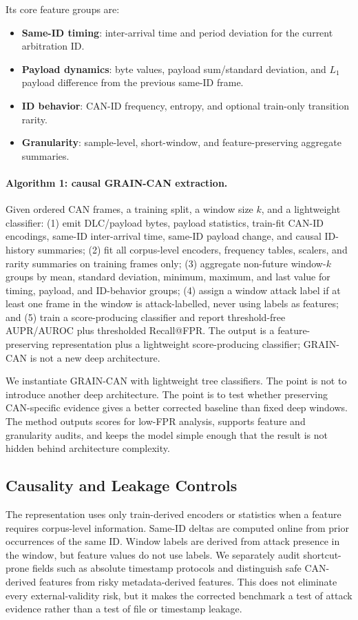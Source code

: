 \documentclass[runningheads]{llncs}%
\newcommand{\method}{GRAIN-CAN}
\begin{document}
Its core feature groups are:
\begin{itemize}
    \item \textbf{Same-ID timing}: inter-arrival time and period deviation for the current arbitration ID.
    \item \textbf{Payload dynamics}: byte values, payload sum/standard deviation, and $L_1$ payload difference from the previous same-ID frame.
    \item \textbf{ID behavior}: CAN-ID frequency, entropy, and optional train-only transition rarity.
    \item \textbf{Granularity}: sample-level, short-window, and feature-preserving aggregate summaries.
\end{itemize}


\paragraph{Algorithm 1: causal GRAIN-CAN extraction.}
Given ordered CAN frames, a training split, a window size $k$, and a lightweight classifier:
(1) emit DLC/payload bytes, payload statistics, train-fit CAN-ID encodings, same-ID inter-arrival time, same-ID payload change, and causal ID-history summaries;
(2) fit all corpus-level encoders, frequency tables, scalers, and rarity summaries on training frames only;
(3) aggregate non-future window-$k$ groups by mean, standard deviation, minimum, maximum, and last value for timing, payload, and ID-behavior groups;
(4) assign a window attack label if at least one frame in the window is attack-labelled, never using labels as features; and
(5) train a score-producing classifier and report threshold-free AUPR/AUROC plus thresholded Recall@FPR.
The output is a feature-preserving representation plus a lightweight score-producing classifier; \method{} is not a new deep architecture.

We instantiate \method{} with lightweight tree classifiers.  The point is not to introduce another deep architecture.  The point is to test whether preserving CAN-specific evidence gives a better corrected baseline than fixed deep windows.  The method outputs scores for low-FPR analysis, supports feature and granularity audits, and keeps the model simple enough that the result is not hidden behind architecture complexity.

\subsection{Causality and Leakage Controls}
The representation uses only train-derived encoders or statistics when a feature requires corpus-level information.  Same-ID deltas are computed online from prior occurrences of the same ID.  Window labels are derived from attack presence in the window, but feature values do not use labels.  We separately audit shortcut-prone fields such as absolute timestamp protocols and distinguish safe CAN-derived features from risky metadata-derived features.  This does not eliminate every external-validity risk, but it makes the corrected benchmark a test of attack evidence rather than a test of file or timestamp leakage.
\end{document}

